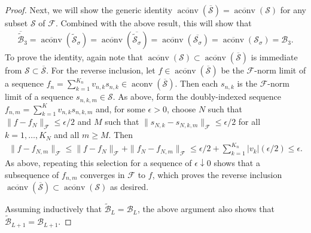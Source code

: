 \documentclass{article}
\DeclareMathOperator{\aconv}{\mathrm{aconv}}
\def\cB{{\mathcal{B}}}
\def\cF{{\mathcal{F}}}
\def\cS{{\mathcal{S}}}
\begin{document}
\begin{appendices}
\begin{proof}
Next, we will show the generic identity $\overline{\aconv}(\overline{\cS}) = \overline{\aconv}(\cS)$ for any subset $\cS$ of $\cF$. Combined with the above result, this will show that
\begin{align}
    \overline{\widetilde{\cB}}_3 = \overline{\aconv}(\widetilde{\cS}_\sigma) = \overline{\aconv}(\overline{\widetilde{\cS}_\sigma}) = \overline{\aconv}(\overline{\cS_\sigma}) = \overline{\aconv}(\cS_\sigma) = \cB_3.
\end{align}
To prove the identity, again note that $\overline{\aconv}(\cS) \subset \overline{\aconv}(\overline{\cS})$ is immediate from $\cS \subset \overline{\cS}$. For the reverse inclusion, let $f \in \overline{\aconv}(\overline{\cS})$ be the $\cF$-norm limit of a sequence $f_n = \sum_{k=1}^{K_n} v_{n,k} s_{n,k} \in \aconv(\overline{\cS})$. Then each $s_{n,k}$ is the $\cF$-norm limit of a sequence $s_{n,k,m} \in \cS$. As above, form the doubly-indexed sequence $f_{n,m} = \sum_{k=1}^K v_{n,k} s_{n,k,m}$ and, for some $\epsilon > 0$, choose $N$ such that $\| f - f_N \|_{\cF} \leq \epsilon/2$ and $M$ such that $\| s_{N,k} - s_{N,k,m} \|_\cF \leq \epsilon/2$ for all $k = 1, \dots, K_N$ and all $m \geq M$. Then
\begin{align}
    \| f - f_{N,m} \|_{\cF} \leq \| f - f_N \|_\cF + \| f_N - f_{N,m} \|_\cF \leq \epsilon/2 + \sum_{k=1}^{K_n} |v_k| (\epsilon/2) \leq \epsilon.
\end{align}
As above, repeating this selection for a sequence of $\epsilon \downarrow 0$ shows that a subsequence of $f_{n,m}$ converges in $\cF$ to $f$, which proves the reverse inclusion $\overline{\aconv}(\overline{\cS}) \subset \overline{\aconv}(\cS)$ as desired. 

Assuming inductively that $\widetilde{\cB}_L = \cB_L$, the above argument also shows that $\widetilde{\cB}_{L+1} = \cB_{L+1}$.
\end{proof}




\end{appendices}
\end{document}
